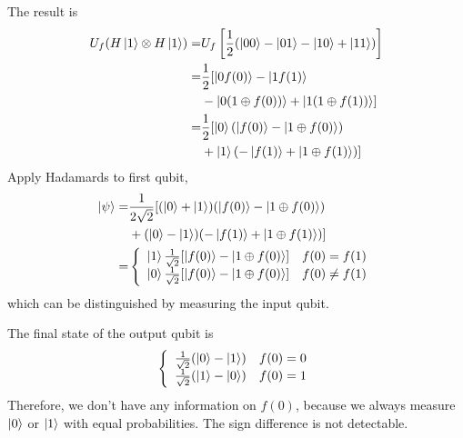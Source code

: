 \begin{figure}[H]
    \centering
\end{figure}

The result is
\begin{align*}
    U_f(H\ket{1}\otimes H\ket{1})=&U_f\left[\frac{1}{2}(\ket{00}-\ket{01}-\ket{10}+\ket{11})\right]\\
    =&\frac{1}{2}[\ket{0f(0)}-\ket{1f(1)}\\
    &-\ket{0(1\oplus f(0))}+\ket{1(1\oplus f(1))}]\\
    =&\frac{1}{2}[\ket{0}(\ket{f(0)}-\ket{1\oplus f(0)})\\
    &+\ket{1}(-\ket{f(1)}+\ket{1\oplus f(1)})]
\end{align*}
Apply Hadamards to first qubit,
\begin{align*}
    \ket{\psi}=&\frac{1}{2\sqrt{2}}[(\ket{0}+\ket{1})(\ket{f(0)}-\ket{1\oplus f(0)})\\
    &+(\ket{0}-\ket{1})(-\ket{f(1)}+\ket{1\oplus f(1)})]\\
    =&\left\{\begin{array}{ll}
        \ket{1}\frac{1}{\sqrt{2}}[\ket{f(0)}-\ket{1\oplus f(0)}] & f(0)=f(1)\\
        \ket{0}\frac{1}{\sqrt{2}}[\ket{f(0)}-\ket{1\oplus f(0)}] & f(0)\ne f(1)
    \end{array}\right.
\end{align*}
which can be distinguished by measuring the input qubit.

The final state of the output qubit is
\begin{align*}
    \left\{\begin{array}{ll}
        \frac{1}{\sqrt{2}}(\ket{0}-\ket{1}) & f(0)=0\\
        \frac{1}{\sqrt{2}}(\ket{1}-\ket{0}) & f(0)=1
    \end{array} \right.
\end{align*}
Therefore, we don't have any information on $f (0)$, because we always measure $\ket{0}$ or $\ket{1}$ with equal probabilities. The sign difference is not detectable.

